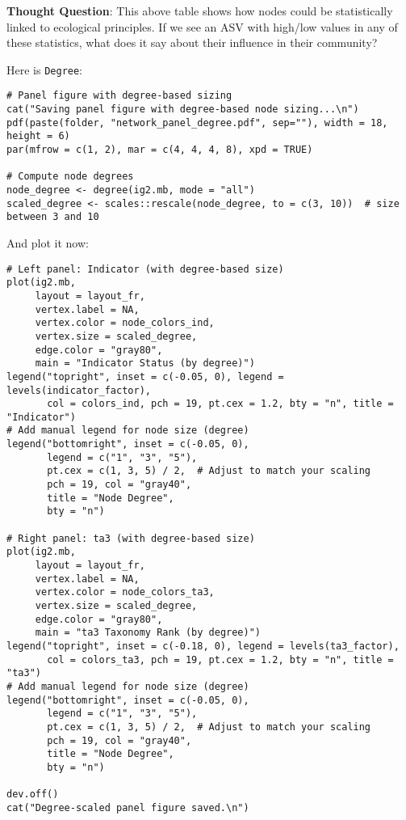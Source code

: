 \documentclass[
]{book}
\begin{document}
\textbf{Thought Question}: This above table shows how nodes could be statistically linked to ecological principles. If we see an ASV with high/low values in any of these statistics, what does it say about their influence in their community?

Here is \texttt{Degree}:

\begin{verbatim}
# Panel figure with degree-based sizing
cat("Saving panel figure with degree-based node sizing...\n")
pdf(paste(folder, "network_panel_degree.pdf", sep=""), width = 18, height = 6)
par(mfrow = c(1, 2), mar = c(4, 4, 4, 8), xpd = TRUE)

# Compute node degrees
node_degree <- degree(ig2.mb, mode = "all")
scaled_degree <- scales::rescale(node_degree, to = c(3, 10))  # size between 3 and 10
\end{verbatim}

And plot it now:

\begin{verbatim}
# Left panel: Indicator (with degree-based size)
plot(ig2.mb,
     layout = layout_fr,
     vertex.label = NA,
     vertex.color = node_colors_ind,
     vertex.size = scaled_degree,
     edge.color = "gray80",
     main = "Indicator Status (by degree)")
legend("topright", inset = c(-0.05, 0), legend = levels(indicator_factor),
       col = colors_ind, pch = 19, pt.cex = 1.2, bty = "n", title = "Indicator")
# Add manual legend for node size (degree)
legend("bottomright", inset = c(-0.05, 0),
       legend = c("1", "3", "5"),
       pt.cex = c(1, 3, 5) / 2,  # Adjust to match your scaling
       pch = 19, col = "gray40",
       title = "Node Degree",
       bty = "n")

# Right panel: ta3 (with degree-based size)
plot(ig2.mb,
     layout = layout_fr,
     vertex.label = NA,
     vertex.color = node_colors_ta3,
     vertex.size = scaled_degree,
     edge.color = "gray80",
     main = "ta3 Taxonomy Rank (by degree)")
legend("topright", inset = c(-0.18, 0), legend = levels(ta3_factor),
       col = colors_ta3, pch = 19, pt.cex = 1.2, bty = "n", title = "ta3")
# Add manual legend for node size (degree)
legend("bottomright", inset = c(-0.05, 0),
       legend = c("1", "3", "5"),
       pt.cex = c(1, 3, 5) / 2,  # Adjust to match your scaling
       pch = 19, col = "gray40",
       title = "Node Degree",
       bty = "n")

dev.off()
cat("Degree-scaled panel figure saved.\n")
\end{verbatim}
\end{document}
